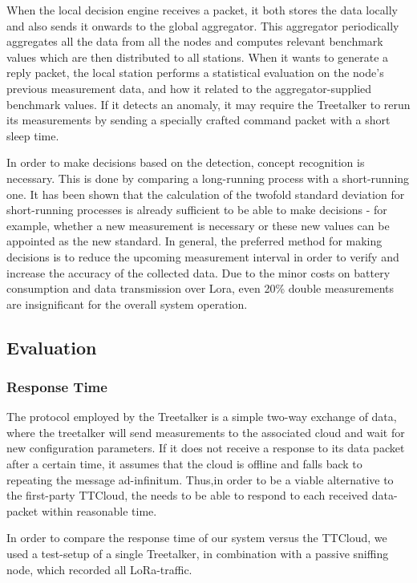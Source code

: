 When the local decision engine receives a packet, it both stores the data locally and also sends it onwards to the global aggregator.
This aggregator periodically aggregates all the data from all the nodes and computes relevant benchmark values which are then distributed to all stations.
When it wants to generate a reply packet, the local station performs a statistical evaluation on the node's previous measurement data, and how it related to the aggregator-supplied benchmark values.
If it detects an anomaly, it may require the Treetalker to rerun its measurements by sending a specially crafted command packet with a short sleep time.

In order to make decisions based on the detection, concept recognition is necessary. This is done by comparing a long-running process with a short-running one. It has been shown that the calculation of the twofold standard deviation for short-running processes is already sufficient to be able to make decisions - for example, whether a new measurement is necessary or these new values can be appointed as the new standard. In general, the preferred method for making decisions is to reduce the upcoming measurement interval in order to verify and increase the accuracy of the collected data. Due to the minor costs on battery consumption and data transmission over Lora, even 20\% double measurements are insignificant for the overall system operation. 

\subsection{Evaluation}
\label{sec:treetalker:evaluation}

\subsubsection{Response Time}
\label{sec:evaluation:response-time}

The protocol employed by the Treetalker is a simple two-way exchange of data, where the treetalker will send measurements to the associated cloud and wait for new configuration parameters.
If it does not receive a response to its data packet after a certain time, it assumes that the cloud is offline and falls back to repeating the message ad-infinitum.
Thus,in order to be a viable alternative to the first-party TTCloud, the \ttt needs to be able to respond to each received data-packet within reasonable time.

In order to compare the response time of our system versus the TTCloud, we used a test-setup of a single Treetalker, in combination with a passive sniffing node, which recorded all LoRa-traffic.

